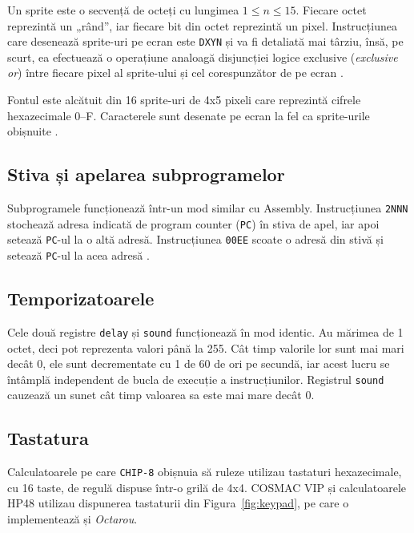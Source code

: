 \documentclass[a4paper]{article}
\begin{document}
Un sprite este o secvență de octeți cu lungimea $1 \leq n \leq 15$. Fiecare octet reprezintă un „rând”, iar fiecare bit din octet reprezintă
un pixel. Instrucțiunea care desenează sprite-uri pe ecran este \texttt{DXYN} și va fi detaliată mai târziu, însă, pe scurt, ea efectuează o operațiune
analoagă disjuncției logice exclusive (\textit{exclusive or}) între fiecare pixel al sprite-ului și cel corespunzător de pe ecran \cite{langhoff}.

Fontul este alcătuit din 16 sprite-uri de 4x5 pixeli care reprezintă cifrele hexazecimale 0--F. Caracterele sunt desenate pe ecran la fel ca
sprite-urile obișnuite \cite{langhoff}.

\subsection{Stiva și apelarea subprogramelor}
Subprogramele funcționează într-un mod similar cu Assembly. Instrucțiunea \texttt{2NNN} stochează adresa indicată de program counter (\texttt{PC})
în stiva de apel, iar apoi setează \texttt{PC}-ul la o altă adresă. Instrucțiunea \texttt{00EE} scoate o adresă din stivă și setează \texttt{PC}-ul
la acea adresă \cite{langhoff}.

\subsection{Temporizatoarele}
Cele două registre \texttt{delay} și \texttt{sound} funcționează în mod identic. Au mărimea de 1 octet, deci pot reprezenta valori până la 255.
Cât timp valorile lor sunt mai mari decât 0, ele sunt decrementate cu 1 de 60 de ori pe secundă, iar acest lucru se întâmplă independent
de bucla de execuție a instrucțiunilor.
Registrul \texttt{sound} cauzează un sunet cât timp valoarea sa este mai mare decât 0.

\subsection{Tastatura}
Calculatoarele pe care \texttt{CHIP-8} obișnuia să ruleze utilizau tastaturi hexazecimale, cu 16 taste, de regulă dispuse într-o grilă de 4x4.
COSMAC VIP și calculatoarele HP48 utilizau dispunerea tastaturii din Figura~\ref{fig:keypad}, pe care o implementează și \textit{Octarou}.
\end{document}
